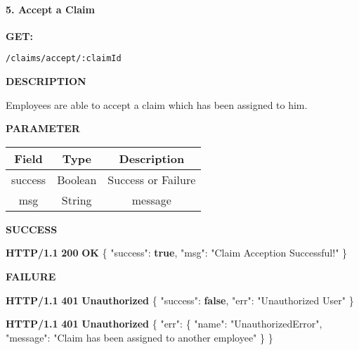 \documentclass[
]{article}
\newenvironment{Shaded}{}{}
\newcommand{\DataTypeTok}[1]{\textcolor[rgb]{0.56,0.13,0.00}{#1}}
\newcommand{\ErrorTok}[1]{\textcolor[rgb]{1.00,0.00,0.00}{\textbf{#1}}}
\newcommand{\FunctionTok}[1]{\textcolor[rgb]{0.02,0.16,0.49}{#1}}
\newcommand{\KeywordTok}[1]{\textcolor[rgb]{0.00,0.44,0.13}{\textbf{#1}}}
\newcommand{\StringTok}[1]{\textcolor[rgb]{0.25,0.44,0.63}{#1}}
\begin{document}
\hypertarget{header-n943}{%
\paragraph{5. Accept a Claim}\label{header-n943}}

\textbf{GET:}

\begin{verbatim}
/claims/accept/:claimId
\end{verbatim}

\textbf{DESCRIPTION}

Employees are able to accept a claim which has been assigned to him.

\textbf{PARAMETER}

\begin{longtable}[]{@{}ccc@{}}
\toprule
Field & Type & Description\tabularnewline
\midrule
\endhead
success & Boolean & Success or Failure\tabularnewline
msg & String & message\tabularnewline
\bottomrule
\end{longtable}

\textbf{SUCCESS}

\begin{Shaded}
\begin{Highlighting}[]
\ErrorTok{HTTP/1.1} \ErrorTok{200} \ErrorTok{OK}
\FunctionTok{\{}
    \DataTypeTok{"success"}\FunctionTok{:} \KeywordTok{true}\FunctionTok{,}
    \DataTypeTok{"msg"}\FunctionTok{:} \StringTok{"Claim Acception Successful!"}
\FunctionTok{\}}
\end{Highlighting}
\end{Shaded}

\textbf{FAILURE}

\begin{Shaded}
\begin{Highlighting}[]
\ErrorTok{HTTP/1.1} \ErrorTok{401} \ErrorTok{Unauthorized}
\FunctionTok{\{}
    \DataTypeTok{"success"}\FunctionTok{:} \KeywordTok{false}\FunctionTok{,}
    \DataTypeTok{"err"}\FunctionTok{:} \StringTok{"Unauthorized User"}
\FunctionTok{\}}
\end{Highlighting}
\end{Shaded}

\begin{Shaded}
\begin{Highlighting}[]
\ErrorTok{HTTP/1.1} \ErrorTok{401} \ErrorTok{Unauthorized}
\FunctionTok{\{}
    \DataTypeTok{"err"}\FunctionTok{:} \FunctionTok{\{}
        \DataTypeTok{"name"}\FunctionTok{:} \StringTok{"UnauthorizedError"}\FunctionTok{,}
        \DataTypeTok{"message"}\FunctionTok{:} \StringTok{"Claim has been assigned to another employee"}
    \FunctionTok{\}}
\FunctionTok{\}}
\end{Highlighting}
\end{Shaded}
\end{document}
